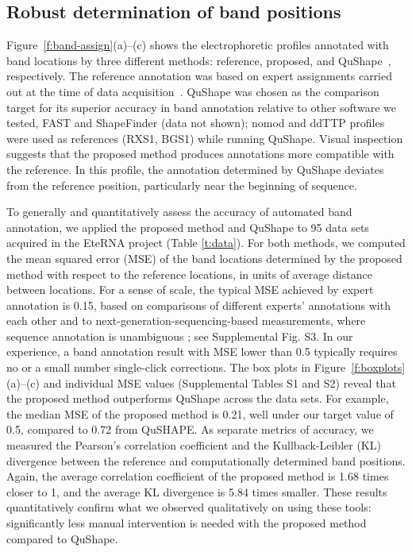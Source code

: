 \newcommand{\bP}{{\mathbf{P}}}

\subsection{Robust determination of band positions}\label{ss:band-position}
Figure~\ref{f:band-assign}(a)--(c) shows the electrophoretic profiles annotated with band locations by three different methods: reference, proposed, and QuShape~\citep{Karabiber2013}, respectively. The reference annotation was based on expert assignments carried out at the time of data acquisition~\citep{lee2014eterna}. QuShape was chosen as the comparison target for its superior accuracy in band annotation relative to other software we tested, FAST and ShapeFinder (data not shown); nomod and ddTTP profiles were used as references (RXS1, BGS1) while running QuShape. Visual inspection suggests that the proposed method produces annotations more compatible with the reference. In this profile, the annotation determined by QuShape deviates from the reference position, particularly near the beginning of sequence.

To generally and quantitatively assess the accuracy of automated band annotation, we applied the proposed method and QuShape to 95 data sets acquired in the EteRNA project (Table \ref{t:data}). For both methods, we computed the mean squared error (MSE) of the band locations determined by the proposed method with respect to the reference locations, in units of average distance between locations. For a sense of scale, the typical MSE achieved by expert annotation is 0.15, based on comparisons of different experts' annotations with each other and to next-generation-sequencing-based measurements, where sequence annotation is unambiguous \citep{Kladwang2014}; see Supplemental Fig. S3. In our experience, a band annotation result with MSE lower than 0.5 typically requires no or a small number single-click corrections. The box plots in Figure~\ref{f:boxplots}(a)--(c) and individual MSE values (Supplemental Tables S1 and S2) reveal that the proposed method outperforms QuShape across the data sets. For example, the median MSE of the proposed method is 0.21, well under our target value of 0.5, compared to 0.72 from QuSHAPE. As separate metrics of accuracy, we measured the Pearson's correlation coefficient and the Kullback-Leibler (KL) divergence between the reference and computationally determined band positions.  Again, the average correlation coefficient of the proposed method is 1.68 times closer to 1, and the average KL divergence is 5.84 times smaller. These results quantitatively confirm what we observed qualitatively on using these tools: significantly less manual intervention is needed with the proposed method compared to QuShape.

